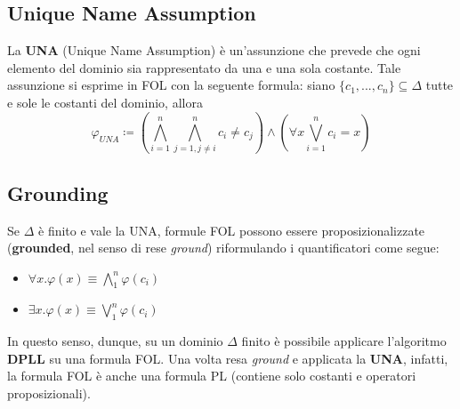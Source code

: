 \subsection{Unique Name Assumption}

La \textbf{UNA} (Unique Name Assumption) è un'assunzione che prevede che ogni elemento del dominio sia rappresentato da una e una sola costante. Tale assunzione si esprime in FOL con la seguente formula: siano $\lbrace c_1, ..., c_n \rbrace \subseteq \Delta$ tutte e sole le costanti del dominio, allora
$$ \varphi_{UNA} \coloneqq (\bigwedge\limits_{i=1}^n \bigwedge\limits_{j=1,j\neq i}^n c_i \neq c_j) \land (\forall x \bigvee\limits_{i = 1}^n c_i = x)$$

\subsection{Grounding}

Se $\Delta$ è finito e vale la UNA, formule FOL possono essere proposizionalizzate (\textbf{grounded}, nel senso di rese \textit{ground}) riformulando i quantificatori come segue:
\begin{itemize}
\item $\forall x . \varphi(x) \equiv \bigwedge\limits_1^n  \varphi(c_i) $
\item $\exists x . \varphi(x) \equiv \bigvee\limits_1^n  \varphi(c_i) $
\end{itemize}

In questo senso, dunque, su un dominio $\Delta$ finito è possibile applicare l'algoritmo \textbf{DPLL} su una formula FOL. Una volta resa \textit{ground} e applicata la \textbf{UNA}, infatti, la formula FOL è anche una formula PL (contiene solo costanti e operatori proposizionali).

